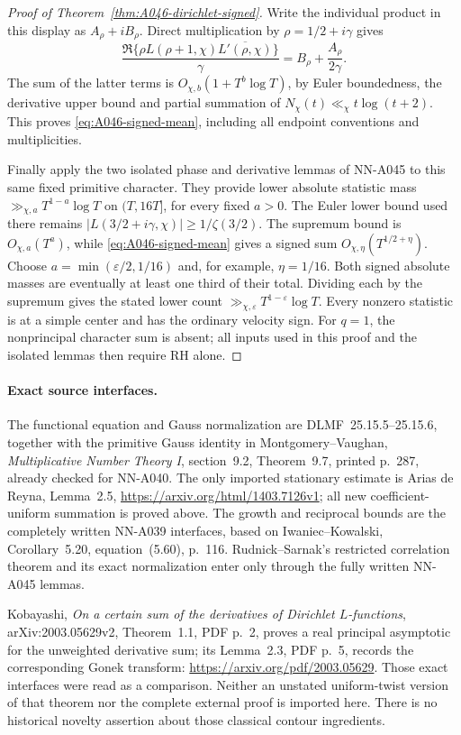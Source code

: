 \begin{proof}[Proof of Theorem~\ref{thm:A046-dirichlet-signed}]
Write the individual product in this display as \(A_\rho+iB_\rho\).
Direct multiplication by \(\rho=1/2+i\gamma\) gives
\[
  \frac{\Re\{\rho L(\rho+1,\chi)\overline{L'(\rho,\chi)}\}}{\gamma}
                         =B_\rho+\frac{A_\rho}{2\gamma}.
\]
The sum of the latter terms is
\(O_{\chi,b}(1+T^b\log T)\), by Euler boundedness,
the derivative upper bound and partial summation of
\(N_\chi(t)\ll_\chi t\log(t+2)\).
This proves \eqref{eq:A046-signed-mean}, including all
endpoint conventions and multiplicities.

Finally apply the two isolated phase and derivative lemmas
of NN-A045 to this same fixed primitive character.
They provide lower absolute statistic mass
\(\gg_{\chi,a}T^{1-a}\log T\) on \((T,16T]\), for every
fixed \(a>0\). The Euler lower bound used there remains
\(|L(3/2+i\gamma,\chi)|\ge1/\zeta(3/2)\).
The supremum bound is \(O_{\chi,a}(T^a)\), while
\eqref{eq:A046-signed-mean} gives a signed sum
\(O_{\chi,\eta}(T^{1/2+\eta})\).
Choose \(a=\min(\varepsilon/2,1/16)\) and, for example,
\(\eta=1/16\). Both signed absolute masses are eventually
at least one third of their total. Dividing each by the
supremum gives the stated lower count
\(\gg_{\chi,\varepsilon}T^{1-\varepsilon}\log T\).
Every nonzero statistic is at a simple center and has the
ordinary velocity sign. For \(q=1\), the nonprincipal
character sum is absent; all inputs used in this proof and
the isolated lemmas then require RH alone.
\end{proof}

\paragraph{Exact source interfaces.}
The functional equation and Gauss normalization are
DLMF~25.15.5--25.15.6, together with the primitive Gauss
identity in Montgomery--Vaughan, \emph{Multiplicative Number
Theory I}, section~9.2, Theorem~9.7, printed p.~287,
already checked for NN-A040.
The only imported stationary estimate is Arias de Reyna,
Lemma~2.5, \url{https://arxiv.org/html/1403.7126v1};
all new coefficient-uniform summation is proved above.
The growth and reciprocal bounds are the completely written
NN-A039 interfaces, based on Iwaniec--Kowalski,
Corollary~5.20, equation~(5.60), p.~116.
Rudnick--Sarnak's restricted correlation theorem and its
exact normalization enter only through the fully written
NN-A045 lemmas.

Kobayashi, \emph{On a certain sum of the derivatives of
Dirichlet \(L\)-functions}, arXiv:2003.05629v2,
Theorem~1.1, PDF p.~2, proves a real principal asymptotic
for the unweighted derivative sum; its Lemma~2.3,
PDF p.~5, records the corresponding Gonek transform:
\url{https://arxiv.org/pdf/2003.05629}.
Those exact interfaces were read as a comparison. Neither
an unstated uniform-twist version of that theorem nor the
complete external proof is imported here. There is no
historical novelty assertion about those classical contour
ingredients.

